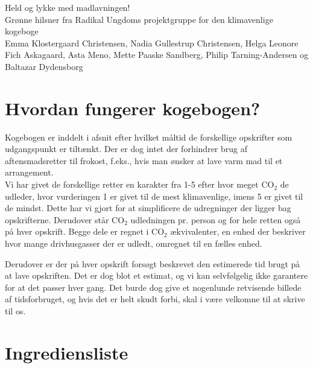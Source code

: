 \documentclass[11pt, a4paper]{article}
\newcommand{\coo}{CO$_2$ }
\begin{document}
Held og lykke med madlavningen!\\
Grønne hilsner fra Radikal Ungdoms projektgruppe for den klimavenlige kogeboge\\
Emma Klostergaard Christensen, Nadia Gullestrup Christensen, Helga Leonore Fich Askagaard, Asta Meno, Mette Paaske Sandberg, Philip Tarning-Andersen og Baltazar Dydensborg

\newpage
\thispagestyle{empty}
\section*{Hvordan fungerer kogebogen?}

Kogebogen er inddelt i afsnit efter hvilket måltid de forskellige opskrifter som udgangspunkt er tiltænkt. Der er dog intet der forhindrer brug af aftensmadsretter til frokost, f.eks., hvis man ønsker at lave varm mad til et arrangement. \\

Vi har givet de forskellige retter  en karakter fra 1-5 efter hvor meget \coo de udleder, hvor vurderingen 1 er givet til de mest klimavenlige, imens 5 er givet til de mindst. Dette har vi gjort for at simplificere de udregninger der ligger bag opskrifterne. Derudover står \coo udledningen pr. person og for hele retten også på hver opskrift. Begge dele er regnet i \coo ækvivalenter, en enhed der beskriver hvor mange drivhusgasser der er udledt, omregnet til en fælles enhed.

Derudover er der på hver opskrift forsøgt beskrevet den estimerede tid brugt på at lave opskriften. Det er dog blot et estimat, og vi kan selvfølgelig ikke garantere for at det passer hver gang. Det burde dog give et nogenlunde retvisende billede af tidsforbruget, og hvis det er helt skudt forbi, skal i være velkomne til at skrive til os.

\newpage
\tableofcontents

\vspace{5em}
\newpage


	
\newpage

\section{Ingrediensliste}
\end{document}

